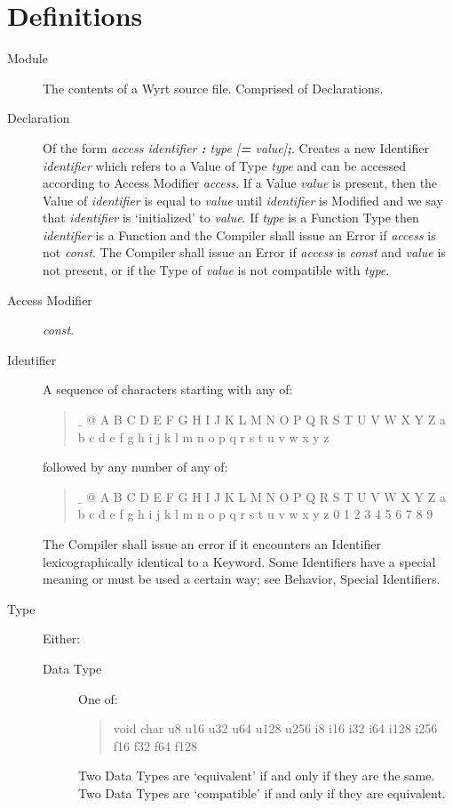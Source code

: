\documentclass{article}
\begin{document}
\section{Definitions}
	\begin{description}
	\item[Module] The contents of a Wyrt source file. Comprised of Declarations.
	\item[Declaration] Of the form \textit{access identifier \textbf{:} type [\textbf{=} value]\textbf{;}}. Creates a new Identifier \textit{identifier} which refers to a Value of Type \textit{type} and can be accessed according to Access Modifier \textit{access}. If a Value \textit{value} is present, then the Value of \textit{identifier} is equal to \textit{value} until \textit{identifier} is Modified and we say that \textit{identifier} is `initialized' to \textit{value}. If \textit{type} is a Function Type then \textit{identifier} is a Function and the Compiler shall issue an Error if \textit{access} is not \textit{const}. The Compiler shall issue an Error if \textit{access} is \textit{const} and \textit{value} is not present, or if the Type of \textit{value} is not compatible with \textit{type}.
	\item[Access Modifier] \textit{const}.
	\item[Identifier] A sequence of characters starting with any of:
		\begin{quote}
		$\_$ @ A B C D E F G H I J K L M N O P Q R S T U V W X Y Z a b c d e f g h i j k l m n o p q r s t u v w x y z
		\end{quote}
		followed by any number of any of:
		\begin{quote}
		$\_$ @ A B C D E F G H I J K L M N O P Q R S T U V W X Y Z a b c d e f g h i j k l m n o p q r s t u v w x y z 0 1 2 3 4 5 6 7 8 9
		\end{quote}
		The Compiler shall issue an error if it encounters an Identifier lexicographically identical to a Keyword. Some Identifiers have a special meaning or must be used a certain way; see Behavior, Special Identifiers.
	\item[Type] Either:
		\begin{description}
		\item[Data Type] One of:
			\begin{quote}
			void char u8 u16 u32 u64 u128 u256 i8 i16 i32 i64 i128 i256 f16 f32 f64 f128 
			\end{quote}
			Two Data Types are `equivalent' if and only if they are the same. Two Data Types are `compatible' if and only if they are equivalent.

\end{description}
\end{description}
\end{document}
